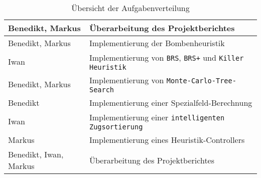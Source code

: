 \begin{table}[!h]
\begin{tabular}{|l|l|}
        \hline
        Benedikt, Markus & \"Uberarbeitung des Projektberichtes \\
        \hline
        Benedikt, Markus & Implementierung der Bombenheuristik \\
        \hline
        Iwan & Implementierung von \texttt{BRS}, \texttt{BRS+} und \texttt{Killer Heuristik} \\
        \hline
        Benedikt, Markus & Implementierung von \texttt{Monte-Carlo-Tree-Search} \\
        \hline
        Benedikt & Implementierung einer Spezialfeld-Berechnung \\
        \hline
        Iwan & Implementierung einer \texttt{intelligenten Zugsortierung} \\
        \hline
        Markus & Implementierung eines Heuristik-Controllers \\
        \hline
        Benedikt, Iwan, Markus & \"Uberarbeitung des Projektberichtes \\
        \hline
    \end{tabular}
    \caption{\"Ubersicht der Aufgabenverteilung}
    \label{tab:arbeitsverteilung}
\end{table}
\vspace{1em}

\newpage

